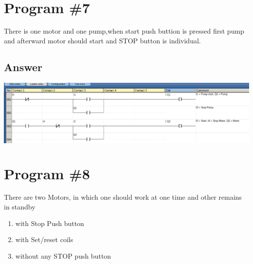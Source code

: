 \documentclass[
	12pt, %
]{fphw}
\begin{document}
\section*{Program \#7}                                                           
\begin{problem}
There is one motor and one pump,when start push buttion is pressed first pump
and afterward motor should start and STOP button is individual.
\medskip
\end{problem}
\subsection*{Answer}
 \begin{center}
  \includegraphics[width=165mm, scale=0.80]{prg7.png}
 \end{center}


\section*{Program \#8}
\begin{problem}
  There are two Motors, in which one should work at one time and other remains
  in standby
  \begin{enumerate}
  \item with Stop Push button
  \item with Set/reset coils
    \item without any STOP push button
  \end{enumerate}
 \medskip
 \end{problem}
\end{document}
